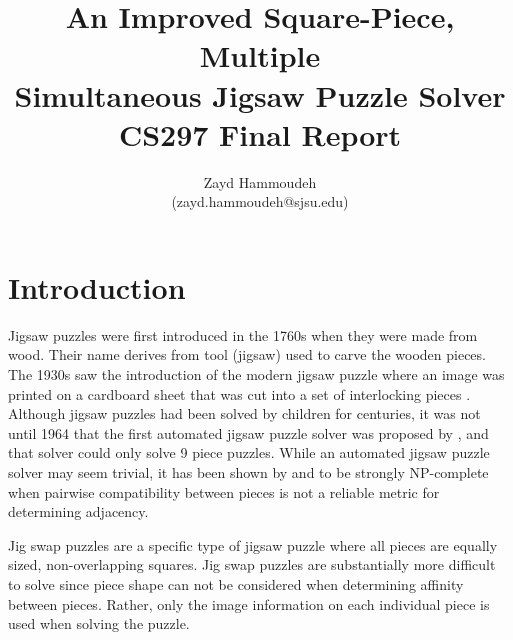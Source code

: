 \documentclass{report}
\title{   An Improved Square-Piece, Multiple
       \\ Simultaneous Jigsaw Puzzle Solver
       \\[1in]
	   CS297 Final Report}
\author{
  Zayd Hammoudeh \\
  (zayd.hammoudeh@sjsu.edu)
  }
\begin{document}
\maketitle


\renewcommand{\contentsname}{Table of Contents} %
\tableofcontents{\protect\newpage}

\listoffigures
\newpage

\listoftables
\newpage
 

\renewcommand\thesection{\arabic{section}}






\section{Introduction}\label{sec:introduction}

Jigsaw puzzles were first introduced in the 1760s when they were made from wood.  Their name derives from tool (jigsaw) used to carve the wooden pieces.   The 1930s saw the introduction of the modern jigsaw puzzle where an image was printed on a cardboard sheet that was cut into a set of interlocking pieces \cite{williams1990, williams2004}.  Although jigsaw puzzles had been solved by children for centuries, it was not until 1964 that the first automated jigsaw puzzle solver was proposed by \cite{freeman1964}, and that solver could only solve 9 piece puzzles.  While an automated jigsaw puzzle solver may seem trivial, it has been shown by \cite{altman1990} and \cite{demaine2007} to be strongly NP-complete when pairwise compatibility between pieces is not a reliable metric for determining adjacency.

Jig swap puzzles are a specific type of jigsaw puzzle where all pieces are equally sized, non-overlapping squares.  Jig swap puzzles are substantially more difficult to solve since piece shape can not be considered when determining affinity between pieces.  Rather, only the image information on each individual piece is used when solving the puzzle.  
\end{document}
